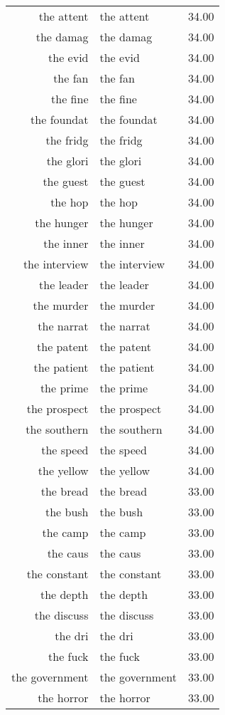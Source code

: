 \begin{table}[ht]
\begin{tabular}{rlr}
  the attent & the attent & 34.00 \\ 
  the damag & the damag & 34.00 \\ 
  the evid & the evid & 34.00 \\ 
  the fan & the fan & 34.00 \\ 
  the fine & the fine & 34.00 \\ 
  the foundat & the foundat & 34.00 \\ 
  the fridg & the fridg & 34.00 \\ 
  the glori & the glori & 34.00 \\ 
  the guest & the guest & 34.00 \\ 
  the hop & the hop & 34.00 \\ 
  the hunger & the hunger & 34.00 \\ 
  the inner & the inner & 34.00 \\ 
  the interview & the interview & 34.00 \\ 
  the leader & the leader & 34.00 \\ 
  the murder & the murder & 34.00 \\ 
  the narrat & the narrat & 34.00 \\ 
  the patent & the patent & 34.00 \\ 
  the patient & the patient & 34.00 \\ 
  the prime & the prime & 34.00 \\ 
  the prospect & the prospect & 34.00 \\ 
  the southern & the southern & 34.00 \\ 
  the speed & the speed & 34.00 \\ 
  the yellow & the yellow & 34.00 \\ 
  the bread & the bread & 33.00 \\ 
  the bush & the bush & 33.00 \\ 
  the camp & the camp & 33.00 \\ 
  the caus & the caus & 33.00 \\ 
  the constant & the constant & 33.00 \\ 
  the depth & the depth & 33.00 \\ 
  the discuss & the discuss & 33.00 \\ 
  the dri & the dri & 33.00 \\ 
  the fuck & the fuck & 33.00 \\ 
  the government & the government & 33.00 \\ 
  the horror & the horror & 33.00 \\ 

\end{tabular}
\end{table}
